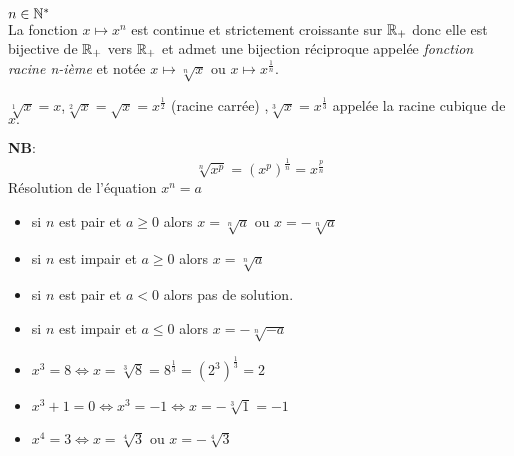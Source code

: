 
\everymath{\displaystyle}

 \summary{}
   \begin{theorem}[et définition]
   
$ n\in \mathbb{N}^* $\\
La fonction $x\mapsto x^{n} $  est continue et strictement croissante sur $ \mathbb{R}_+ $  donc elle est bijective de $ \mathbb{R}_+ $ vers $ \mathbb{R}_+ $ et admet une bijection réciproque appelée \emph{fonction racine n-ième} et notée $ x\mapsto \sqrt[n]{x} $ ou $x\mapsto x^{\frac{1}{n}} $.
\end{theorem}
\begin{example}
$ \sqrt[1]{x}=x $,\quad $ \sqrt[2]{x}=\sqrt{x}=x^{\frac{1}{2}}$\; (racine carrée) ,\quad $ \sqrt[3]{x} =x^{\frac{1}{3}}$  appelée la racine cubique de $ x. $
\end{example}

\textbf{NB}:
\[\sqrt[n]{x^{p}}= (x^{p})^{\frac{1}{n}}= x^{\frac{p}{n}}\]
 \colorbox{red!20!}{Résolution de l'équation $ x^{n}=a $}
\begin{itemize}
\item[\textbullet] si $ n $ est pair  et  $ a\geq 0 $ alors $ x= \sqrt[n]{a}$ ou $ x= -\sqrt[n]{a}$
\item[\textbullet] si $ n $ est impair  et  $ a\geq 0 $ alors $ x= \sqrt[n]{a}$
\item[\textbullet] si $ n $ est pair  et  $ a < 0 $ alors pas de solution. 
\item[\textbullet] si $ n $ est impair  et  $ a\leq 0 $ alors  $ x= -\sqrt[n]{-a}$
\end{itemize}

\begin{example}
\begin{itemize}
\item $ x^3=8 \Longleftrightarrow x=\sqrt[3]{8}= 8^{\frac{1}{3}} = (2^3)^{\frac{1}{3}}=2$
\item $ x^3+1=0\Longleftrightarrow x^3=-1 \Longleftrightarrow x=-\sqrt[3]{1}= -1$
\item $ x^4= 3 \Longleftrightarrow x= \sqrt[4]{3}$ ou $ x= -\sqrt[4]{3} $  
 \end{itemize}
\end{example}
